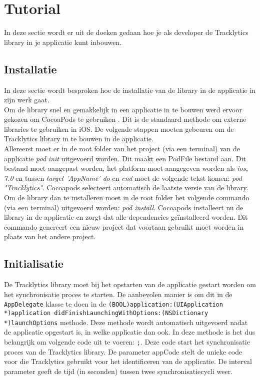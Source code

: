 \chapter{Tutorial}\label{documentatie}
In deze sectie wordt er uit de doeken gedaan hoe je als developer de Tracklytics library in je applicatie kunt inbouwen. 

\section{Installatie}
In deze sectie wordt besproken hoe de installatie van de library in de applicatie in zijn werk gaat. \\

Om de library snel en gemakkelijk in een applicatie in te bouwen werd ervoor gekozen om CocoaPods te gebruiken \cite{CocoaPods}. Dit is de standaard methode om externe libraries te gebruiken in iOS. De volgende stappen moeten gebeuren om de Tracklytics library in te bouwen in de applicatie. \\

\noindent Allereerst moet er in de root folder van het project (via een terminal) van de applicatie \textit{pod init} uitgevoerd worden. Dit maakt een PodFile bestand aan. Dit bestand moet aangepast worden, het platform moet aangegeven worden als \textit{ios, 7.0} en tussen \textit{target 'AppName' do} en \textit{end} moet de volgende tekst komen: \textit{pod "Tracklytics"}. Cocoapods selecteert automatisch de laatste versie van de library. \\

\noindent Om de library dan te installeren moet in de root folder het volgende commando (via een terminal) uitgevoerd worden: \textit{pod install}. Cocoapods installeert nu de library in de applicatie en zorgt dat alle dependencies geïnstalleerd worden. Dit commando genereert een nieuw project dat voortaan gebruikt moet worden in plaats van het andere project.



\section{Initialisatie}
De Tracklytics library moet bij het opstarten van de applicatie gestart worden om het synchronisatie proces te starten. De aanbevolen manier is om dit in de \texttt{\justify AppDelegate} klasse te doen in de \texttt{\justify (BOOL)application:(UIApplication *)application didFinishLaunchingWithOptions:(NSDictionary *)launchOptions} methode. Deze methode wordt automatisch uitgevoerd nadat de applicatie opgestart is, in welke applicatie dan ook. In deze methode is het dus belangrijk om volgende code uit te voeren: \texttt{;}. Deze code start het synchronisatie proces van de Tracklytics library. De parameter appCode stelt de unieke code voor die Tracklytics gebruikt voor het identificeren van de applicatie. De interval parameter geeft de tijd (in seconden) tussen twee synchronisatiecycli weer. 

